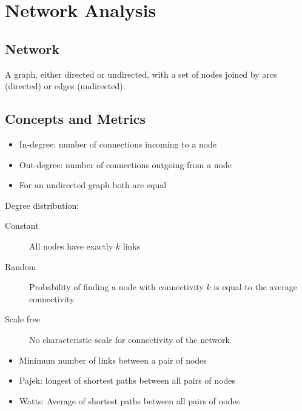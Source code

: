 \documentclass[a4paper]{article}
\begin{document}
\section{Network Analysis}

\subsection{Network}

A graph, either directed or undirected, with a set of nodes joined by arcs
(directed) or edges (undirected).

\subsection{Concepts and Metrics}


\begin{itemize}
  \item
    In-degree: number of connections incoming to a node

  \item
    Out-degree: number of connections outgoing from a node

  \item
    For an undirected graph both are equal
\end{itemize}

Degree distribution:

\begin{description}
  \item[Constant]
    All nodes have exactly $k$ links

  \item[Random]
    Probability of finding a node with connectivity $k$ is equal to the average
    connectivity

  \item[Scale free]
    No characteristic scale for connectivity of the network
\end{description}


\begin{itemize}
  \item
    Minimum number of links between a pair of nodes
\end{itemize}


\begin{itemize}
  \item
    Pajek: longest of shortest paths between all pairs of nodes

  \item
    Watts: Average of shortest paths between all pairs of nodes
\end{itemize}
\end{document}
